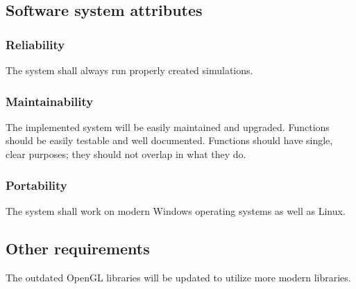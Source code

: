 \documentclass[10pt,journal,compsoc]{IEEEtran}
\begin{document}
\vfill

\subsection{Software system attributes}
\vspace{3mm}
\subsubsection{Reliability}
\vspace{5mm}
The system shall always run properly created simulations.

\subsubsection{Maintainability}
\vspace{3mm}
The implemented system will be easily maintained and upgraded. 
Functions should be easily testable and well documented.
Functions should have single, clear purposes; they should not overlap in what they do.


\subsubsection{Portability}
\vspace{3mm}
The system shall work on modern Windows operating systems as well as Linux.

\vfill

\subsection{Other requirements}
\vspace{3mm}
The outdated OpenGL libraries will be updated to utilize more modern libraries.

\vfill

\newpage
\end{document}
